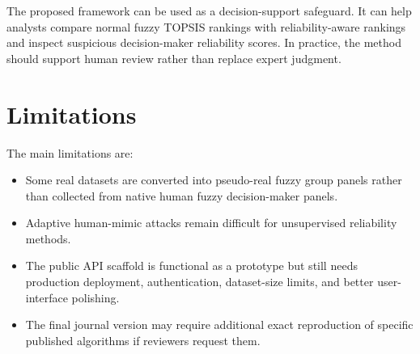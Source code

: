 The proposed framework can be used as a decision-support safeguard. It can help analysts compare normal fuzzy TOPSIS rankings with reliability-aware rankings and inspect suspicious decision-maker reliability scores. In practice, the method should support human review rather than replace expert judgment.

\section{Limitations}

The main limitations are:

\begin{itemize}
    \item Some real datasets are converted into pseudo-real fuzzy group panels rather than collected from native human fuzzy decision-maker panels.
    \item Adaptive human-mimic attacks remain difficult for unsupervised reliability methods.
    \item The public API scaffold is functional as a prototype but still needs production deployment, authentication, dataset-size limits, and better user-interface polishing.
    \item The final journal version may require additional exact reproduction of specific published algorithms if reviewers request them.
\end{itemize}
